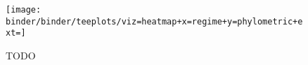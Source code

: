\begin{figure*}
  \centering
  \texttt{[image: binder/binder/teeplots/viz=heatmap+x=regime+y=phylometric+ext=]}
  \caption{TODO}
  \label{fig:perfect-tree-phylometrics-heatmap}
\end{figure*}
